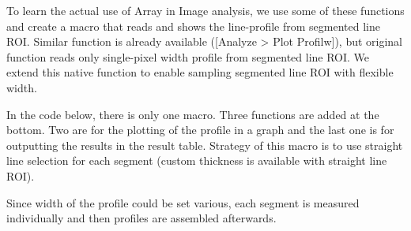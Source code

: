 \documentclass[11pt,a4paper,oneside]{report}
\begin{document}
To learn the actual use of Array in Image analysis, we use some of these functions and create a macro that reads and shows the line-profile from segmented line ROI. Similar function is already available ([Analyze > Plot Profilw]), but original function reads only single-pixel width profile from segmented line ROI. We extend this native function to enable sampling segmented line ROI with flexible width.

In the code below, there is only one macro. Three functions are added at the bottom. Two are for the plotting of the profile in a graph and the last one is for outputting the results in the result table. Strategy of this macro is to use straight line selection for each segment (custom thickness is available with straight line ROI). 

Since width of the profile could be set various, each segment is measured individually and then profiles are assembled afterwards. 

%

\end{document}
